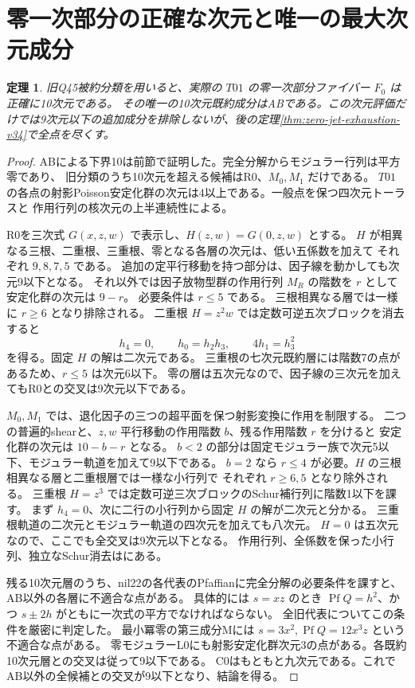 \documentclass[11pt,a4paper]{ltjsarticle}
\newtheorem{theorem}{定理}[section]
\theoremstyle{remark}
\begin{document}
\section{零一次部分の正確な次元と唯一の最大次元成分}
\begin{theorem}\label{thm:zero-jet-exact-v33}
旧Q45被約分類を用いると、実際の $T01$ の零一次部分ファイバー $F_0$ は正確に10次元である。
その唯一の10次元既約成分はABである。この次元評価だけでは9次元以下の追加成分を排除しないが、後の定理\ref{thm:zero-jet-exhaustion-v34}で全点を尽くす。
\end{theorem}
\begin{proof}
ABによる下界10は前節で証明した。完全分解からモジュラー行列は平方零であり、
旧分類のうち10次元を超える候補はR0、$M_0,M_1$ だけである。
$T01$ の各点の射影Poisson安定化群の次元は4以上である。一般点を保つ四次元トーラスと
作用行列の核次元の上半連続性による。

R0を三次式 $G(x,z,w)$ で表示し、$H(z,w)=G(0,z,w)$ とする。
$H$ が相異なる三根、二重根、三重根、零となる各層の次元は、低い五係数を加えて
それぞれ $9,8,7,5$ である。
追加の定平行移動を持つ部分は、因子線を動かしても次元9以下となる。
それ以外では因子放物型群の作用行列 $M_R$ の階数を $r$ として安定化群の次元は $9-r$。
必要条件は $r\le5$ である。
三根相異なる層では一様に $r\ge6$ となり排除される。
二重根 $H=z^2w$ では定数可逆五次ブロックを消去すると
\[
 h_4=0,\qquad h_0=h_2h_3,\qquad 4h_1=h_3^2
\]
を得る。固定 $H$ の解は二次元である。
三重根の七次元既約層には階数7の点があるため、$r\le5$ は次元6以下。
零の層は五次元なので、因子線の三次元を加えてもR0との交叉は9次元以下である。

$M_0,M_1$ では、退化因子の三つの超平面を保つ射影変換に作用を制限する。
二つの普遍的shearと、$z,w$ 平行移動の作用階数 $b$、残る作用階数 $r$ を分けると
安定化群の次元は $10-b-r$ となる。
$b<2$ の部分は固定モジュラー族で次元5以下、モジュラー軌道を加えて9以下である。
$b=2$ なら $r\le4$ が必要。$H$ の三根相異なる層と二重根層では一様な小行列で
それぞれ $r\ge6,5$ となり除外される。
三重根 $H=z^3$ では定数可逆三次ブロックのSchur補行列に階数1以下を課す。
まず $h_4=0$、次に二行の小行列から固定 $H$ の解が二次元と分かる。
三重根軌道の二次元とモジュラー軌道の四次元を加えても八次元。
$H=0$ は五次元なので、ここでも全交叉は9次元以下となる。
作用行列、全係数を保った小行列、独立なSchur消去は\cite{zero-jet-exact-v33}にある。

残る10次元層のうち、nil22の各代表のPfaffianに完全分解の必要条件を課すと、
AB以外の各層に不適合な点がある。
具体的には $s=xz$ のとき $\operatorname{Pf}Q=h^2$、かつ $s\pm2h$ がともに一次式の平方でなければならない。
全旧代表についてこの条件を厳密に判定した\cite{zero-jet-top-v33}。
最小冪零の第三成分Mには $s=3x^2,\operatorname{Pf}Q=12x^3z$ という不適合な点がある。
零モジュラーL0にも射影安定化群次元3の点がある。各既約10次元層との交叉は従って9以下である。
C0はもともと九次元である。これでAB以外の全候補との交叉が9以下となり、結論を得る。
\end{proof}
\end{document}
